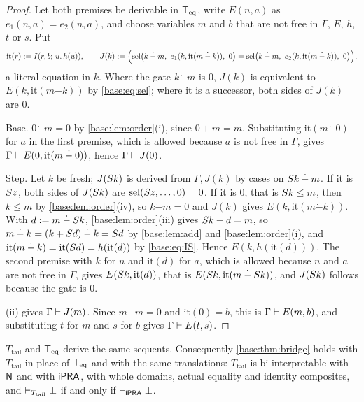 \begin{proof}
Let both premises be derivable in $\mathsf{T}_{\mathrm{eq}}$, write $E(n,a)$ as
$e_1(n,a)=e_2(n,a)$, and choose variables $m$ and $b$ that are not free in
$\Gamma$, $E$, $h$, $t$ or $s$.  Put
\[
 \mathrm{it}(r)\defeq\It{r}{b}{u}{h(u)},\qquad
 J(k)\defeq\Bigl(\sel\bigl(k\mathbin{\dot-}m,\ e_1(k,\mathrm{it}(m\mathbin{\dot-}k)),\ 0\bigr)
   =\sel\bigl(k\mathbin{\dot-}m,\ e_2(k,\mathrm{it}(m\mathbin{\dot-}k)),\ 0\bigr)\Bigr),
\]
a literal equation in $k$.  Where the gate $k\mathbin{\dot-}m$ is $0$,
$J(k)$ is equivalent to $E(k,\mathrm{it}(m\mathbin{\dot-}k))$ by
\eqref{base:eq:sel}; where it is a successor, both sides of $J(k)$ are $0$.

Base.  $0\mathbin{\dot-}m=0$ by \cref{base:lem:order}(i), since $0+m=m$.
Substituting $\mathrm{it}(m\mathbin{\dot-}0)$ for $a$ in the first premise,
which is allowed because $a$ is not free in $\Gamma$, gives
$\Gamma\vdash E(0,\mathrm{it}(m\mathbin{\dot-}0))$, hence
$\Gamma\vdash J(0)$.

Step.  Let $k$ be fresh; $J(S k)$ is derived from $\Gamma,J(k)$ by cases
on $S k\mathbin{\dot-}m$.  If it is $S z$, both sides of $J(S k)$
are $\operatorname{sel}(S z,\dots,0)=0$.  If it is $0$, that is $S k\le m$, then
$k\le m$ by \cref{base:lem:order}(iv), so $k\mathbin{\dot-}m=0$ and $J(k)$
gives $E(k,\mathrm{it}(m\mathbin{\dot-}k))$.  With
$d\mathrel{:=} m\mathbin{\dot-}S k$, \cref{base:lem:order}(iii) gives
$S k+d=m$, so $m\mathbin{\dot-}k=(k+S d)\mathbin{\dot-}k=S d$ by
\cref{base:lem:add} and \cref{base:lem:order}(i), and
$\mathrm{it}(m\mathbin{\dot-}k)=\mathrm{it}(S d)=h(\mathrm{it}(d))$ by
\eqref{base:eq:IS}.  Hence $E(k,h(\mathrm{it}(d)))$.  The second premise
with $k$ for $n$ and $\mathrm{it}(d)$ for $a$, which is allowed because $n$
and $a$ are not free in $\Gamma$, gives $E(S k,\mathrm{it}(d))$, that is
$E(S k,\mathrm{it}(m\mathbin{\dot-}S k))$, and $J(S k)$ follows
because the gate is $0$.

(ii) gives $\Gamma\vdash J(m)$.  Since
$m\mathbin{\dot-}m=0$ and $\mathrm{it}(0)=b$, this is
$\Gamma\vdash E(m,b)$, and substituting $t$ for $m$ and $s$ for $b$ gives
$\Gamma\vdash E(t,s)$.
\end{proof}

\begin{theorem}
\label{base:thm:tail}
$T_{\mathrm{tail}}$ and $\mathsf{T}_{\mathrm{eq}}$ derive the same sequents.  Consequently
\cref{base:thm:bridge} holds with $T_{\mathrm{tail}}$ in place of $\mathsf{T}_{\mathrm{eq}}$ and
with the same translations: $T_{\mathrm{tail}}$ is bi-interpretable with
$\mathsf{N}$ and with $\mathsf{iPRA}$, with whole domains, actual equality and identity
composites, and $\vdash_{T_{\mathrm{tail}}}\bot$ if and only if
$\vdash_{\mathsf{iPRA}}\bot$.
\end{theorem}

